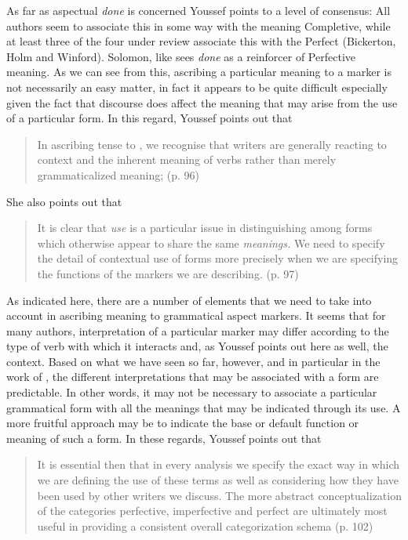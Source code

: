 As far as aspectual \textit{done} is concerned Youssef points to a
level of consensus: All authors seem to associate this in some way
with the meaning Completive, while at least three of the four under
review associate this with the Perfect (Bickerton, Holm and Winford).
Solomon, like \citet{Alleyne1980} sees \textit{done} as a reinforcer
of Perfective meaning.  As we can see from this, ascribing a
particular meaning to a marker is not necessarily an easy matter, in
fact it appears to be quite difficult especially given the fact that
discourse does affect the meaning that may arise from the use of a
particular form.  In this regard, Youssef points out that

\begin{quote}
In ascribing tense to \NULL, we recognise that writers are generally
reacting to context and the inherent meaning of verbs rather than
merely grammaticalized meaning; (p. 96)
\end{quote}

She also points out that

\begin{quote}
  It is clear that \textit{use} is a particular issue in
  distinguishing among forms which otherwise appear to share the same
  \textit{meanings.} We need to specify the detail of contextual use
  of forms more precisely when we are specifying the functions of the
  markers we are describing. (p. 97)
\end{quote}

As indicated here, there are a number of elements that we need to take
into account in ascribing meaning to grammatical aspect markers.  It
seems that for many authors, interpretation of a particular marker may
differ according to the type of verb with which it interacts and, as
Youssef points out here as well, the context.  Based on what we have
seen so far, however, and in particular in the work of
\citet{Sidnell2002}, the different interpretations that may be
associated with a form are predictable.  In other words, it may not be
necessary to associate a particular grammatical form with all the
meanings that may be indicated through its use.  A more fruitful
approach may be to indicate the base or default function or meaning of
such a form.  In these regards, Youssef points out that

\begin{quote}
It is essential then that in every analysis we specify the exact way
in which we are defining the use of these terms as well as considering
how they have been used by other writers we discuss. The more abstract
conceptualization of the categories perfective, imperfective and
perfect are ultimately most useful in providing a consistent overall
categorization schema (p. 102)
\end{quote}

